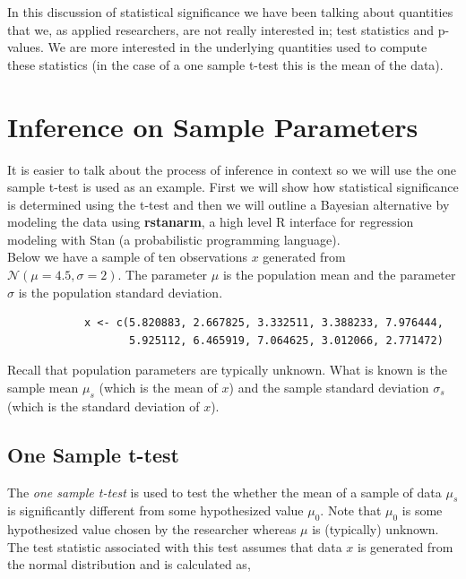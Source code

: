 \documentclass[12pt]{article}
\begin{document}
\noindent In this discussion of statistical significance we have been talking about quantities that we, as applied researchers, are not really interested in; test statistics and p-values. We are more interested in the underlying quantities used to compute these statistics (in the case of a one sample t-test this is the mean of the data). \\

\section{Inference on Sample Parameters}

\noindent It is easier to talk about the process of inference in context so we will use the one sample t-test is used as an example. First we will show how statistical significance is determined using the t-test and then we will outline a Bayesian alternative by modeling the data using \textbf{rstanarm}, a high level R interface for regression modeling with Stan (a probabilistic programming language). \\

\noindent Below we have a sample of ten observations $x$ generated from $\mathcal{N}(\mu = 4.5, \sigma = 2)$. The parameter $\mu$ is the population mean and the parameter $\sigma$ is the population standard deviation.

\begin{verbatim}
            x <- c(5.820883, 2.667825, 3.332511, 3.388233, 7.976444,
                   5.925112, 6.465919, 7.064625, 3.012066, 2.771472)
\end{verbatim}

\noindent Recall that population parameters are typically unknown. What is known is the sample mean $\mu_s$ (which is the mean of $x$) and the sample standard deviation $\sigma_s$ (which is the standard deviation of $x$).

\subsection{One Sample t-test}

The \emph{one sample t-test} is used to test the whether the mean of a sample of data $\mu_s$ is significantly different from some hypothesized value $\mu_0$. Note that $\mu_0$ is some hypothesized value chosen by the researcher whereas $\mu$ is (typically) unknown. The test statistic associated with this test assumes that data $x$ is generated from the normal distribution and is calculated as,
\end{document}
